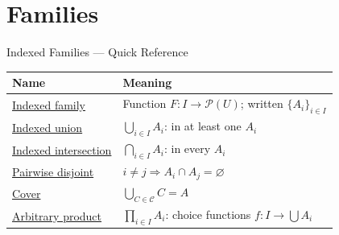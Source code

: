 \section{Families}


\begin{toolkitbox}{Indexed Families --- Quick Reference}
\small
\begin{tabular}{l l}
\toprule
\textbf{Name}  & \textbf{Meaning} \\
\midrule
\hyperref[def:indexed-family]{Indexed family}       & Function $F : I \to \mathcal{P}(U)$; written $\{A_i\}_{i \in I}$ \\
\hyperref[def:indexed-union]{Indexed union}        & $\bigcup_{i \in I} A_i$: in at least one $A_i$                    \\
\hyperref[def:indexed-intersection]{Indexed intersection}  & $\bigcap_{i \in I} A_i$: in every $A_i$                         \\
\hyperref[def:pairwise-disjoint]{Pairwise disjoint}    & $i \neq j \Rightarrow A_i \cap A_j = \varnothing$                  \\
\hyperref[def:set-cover]{Cover}                & $\bigcup_{C \in \mathcal{C}} C = A$                               \\
\hyperref[def:arbitrary-product]{Arbitrary product}    & $\prod_{i \in I} A_i$: choice functions $f : I \to \bigcup A_i$   \\
\bottomrule
\end{tabular}
\end{toolkitbox}





